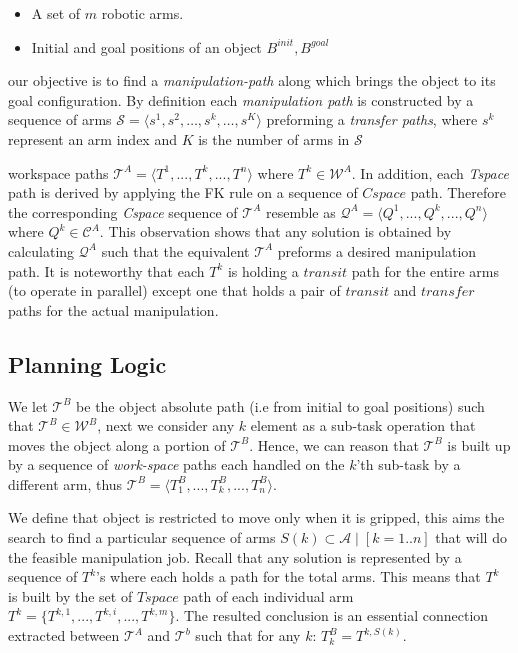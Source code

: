 \begin{itemize}
\item A set of $m$ robotic arms. 
\item Initial and goal positions of an object $B^{init},B^{goal}$
\end{itemize}
our objective is to find a \textit{manipulation-path} along which brings the object to its goal configuration. By definition each \textit{manipulation path} is constructed by a sequence of arms $\mathcal{S} = \langle s^1,s^2,\dots,s^k,\dots,s^K \rangle$ preforming a \textit{transfer paths}, where $s^k$ represent an arm index and $K$ is the number of arms in $\mathcal{S}$

workspace paths $\mathcal{T}^A=\langle T^{1},...,T^k, ...,T^n\rangle$ where $T^k \in \mathcal{W}^A$. In addition, each \textit{Tspace} path is derived by applying the FK rule on a sequence of $Cspace$ path. Therefore the corresponding \textit{Cspace} sequence of $\mathcal{T}^A$ resemble as $\mathcal{Q}^A=\langle Q^{1},...,Q^k, ...,Q^n\rangle$ where $Q^k \in \mathcal{C}^A$. This observation shows that any solution is obtained by calculating $\mathcal{Q}^A$ such that the equivalent $\mathcal{T}^A$ preforms a desired manipulation path. It is noteworthy that each $T^k$ is holding a $transit$ path for the entire arms (to operate in parallel) except one that holds a pair of $transit$ and $transfer$ paths for the actual manipulation.


\subsection{Planning Logic}

We let $\mathcal{T}^B$ be the object absolute path (i.e from initial to goal positions) such that $\mathcal{T}^B \in \mathcal{W}^B$, next we consider any $k$ element as a sub-task operation that moves the object along a portion of $\mathcal{T}^B$. Hence, we can reason that $\mathcal{T}^B$ is built up by a sequence of \textit{work-space} paths each handled on the $k$'th sub-task by a different arm, thus $\mathcal{T}^B = \langle T^B_1,...,T^B_k,...,T^B_n \rangle $. 

We define that object is restricted to move only when it is gripped, this aims the search 
to find a particular sequence of arms $S(k) \subset \mathcal{A} \mid [k=1..n] $ that will do the feasible manipulation job. Recall that any solution is represented by a sequence of $T^k$'s where each holds a path for the total arms. This means that $T^k$ is built by the set of $Tspace$ path of each individual arm $T^k = \{ T^{k,1},...,T^{k,i},...,T^{k,m} \}$. The resulted conclusion is an essential connection extracted between $\mathcal{T}^A$ and $\mathcal{T}^b$ such that for any $k$: $T^B_k = T^{k,S(k)}$.

